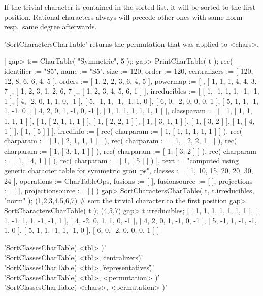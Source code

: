 If the trivial character is contained in the sorted list, it will be
sorted to the first position.
Rational characters always will precede other ones with same norm resp.\
same degree afterwards.

'SortCharactersCharTable' returns the permutation that was applied to
<chars>.

|    gap> t:= CharTable( "Symmetric", 5 );;
    gap> PrintCharTable( t );
    rec( identifier := "S5", name := "S5", size := 120, order :=
    120, centralizers := [ 120, 12, 8, 6, 6, 4, 5 ], orders :=
    [ 1, 2, 2, 3, 6, 4, 5 ], powermap :=
    [ , [ 1, 1, 1, 4, 4, 3, 7 ], [ 1, 2, 3, 1, 2, 6, 7 ],,
      [ 1, 2, 3, 4, 5, 6, 1 ] ], irreducibles :=
    [ [ 1, -1, 1, 1, -1, -1, 1 ], [ 4, -2, 0, 1, 1, 0, -1 ],
      [ 5, -1, 1, -1, -1, 1, 0 ], [ 6, 0, -2, 0, 0, 0, 1 ],
      [ 5, 1, 1, -1, 1, -1, 0 ], [ 4, 2, 0, 1, -1, 0, -1 ],
      [ 1, 1, 1, 1, 1, 1, 1 ] ], classparam :=
    [ [ 1, [ 1, 1, 1, 1, 1 ] ], [ 1, [ 2, 1, 1, 1 ] ], [ 1, [ 2, 2, 1 ] ],
      [ 1, [ 3, 1, 1 ] ], [ 1, [ 3, 2 ] ], [ 1, [ 4, 1 ] ], [ 1, [ 5 ] ]
     ], irredinfo := [ rec(
          charparam := [ 1, [ 1, 1, 1, 1, 1 ] ] ), rec(
          charparam := [ 1, [ 2, 1, 1, 1 ] ] ), rec(
          charparam := [ 1, [ 2, 2, 1 ] ] ), rec(
          charparam := [ 1, [ 3, 1, 1 ] ] ), rec(
          charparam := [ 1, [ 3, 2 ] ] ), rec(
          charparam := [ 1, [ 4, 1 ] ] ), rec(
          charparam := [ 1, [ 5 ] ] )
     ], text := "computed using generic character table for symmetric grou\
    ps", classes := [ 1, 10, 15, 20, 20, 30, 24
     ], operations := CharTableOps, fusions := [  ], fusionsource :=
    [  ], projections := [  ], projectionsource := [  ] )
    gap> SortCharactersCharTable( t, t.irreducibles, "norm" );
    (1,2,3,4,5,6,7)      # sort the trivial character to the first position
    gap> SortCharactersCharTable( t );
    (4,5,7)
    gap> t.irreducibles;
    [ [ 1, 1, 1, 1, 1, 1, 1 ], [ 1, -1, 1, 1, -1, -1, 1 ],
      [ 4, -2, 0, 1, 1, 0, -1 ], [ 4, 2, 0, 1, -1, 0, -1 ],
      [ 5, -1, 1, -1, -1, 1, 0 ], [ 5, 1, 1, -1, 1, -1, 0 ],
      [ 6, 0, -2, 0, 0, 0, 1 ] ]|

%
\index{character tables!sort}%

'SortClassesCharTable( <tbl> )'\\
'SortClassesCharTable( <tbl>, \"centralizers\" )'\\
'SortClassesCharTable( <tbl>, \"representatives\" )'\\
'SortClassesCharTable( <tbl>, <permutation> )'\\
'SortClassesCharTable( <chars>, <permutation> )'

